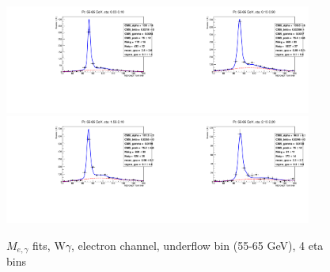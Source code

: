 \begin{figure}[htb]
  \begin{center}
   \includegraphics[width=0.45\textwidth]{../figs/figs_v11/ELECTRON_WGamma/EtoGammaFits/sa_hZmass_h_Data_EtoGamma_Enr_BARREL_pt55to65_ieta0_noWMtCut.pdf}\includegraphics[width=0.45\textwidth]{../figs/figs_v11/ELECTRON_WGamma/EtoGammaFits/sa_hZmass_h_Data_EtoGamma_Enr_BARREL_pt55to65_ieta1_noWMtCut.pdf}\\
   \includegraphics[width=0.45\textwidth]{../figs/figs_v11/ELECTRON_WGamma/EtoGammaFits/sa_hZmass_h_Data_EtoGamma_Enr_ENDCAP_pt55to65_ieta0_noWMtCut.pdf}\includegraphics[width=0.45\textwidth]{../figs/figs_v11/ELECTRON_WGamma/EtoGammaFits/sa_hZmass_h_Data_EtoGamma_Enr_ENDCAP_pt55to65_ieta1_noWMtCut.pdf}\\
  \label{fig:etogFits_55to65}
  \caption{$M_{e,\gamma}$ fits, W$\gamma$, electron channel, underflow bin (55-65 GeV), 4 eta bins}
  \end{center}
\end{figure}

